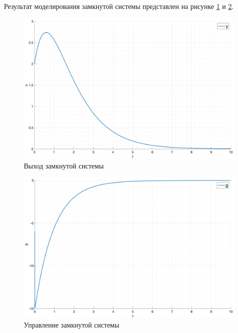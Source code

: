 Результат моделирования замкнутой системы представлен на рисунке \ref{fig:task1_closed} и \ref{fig:task1_closed_in}.

\begin{figure}[ht!]
    \centering
    \includegraphics[width=\textwidth]{"media/plots/task1_out.png"}
    \caption{Выход замкнутой системы}
    \label{fig:task1_closed}
\end{figure}
\begin{figure}[ht!]
    \centering
    \includegraphics[width=\textwidth]{"media/plots/task1_in.png"}
    \caption{Управление замкнутой системы}
    \label{fig:task1_closed_in}
\end{figure}

